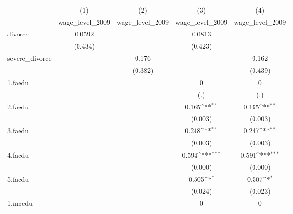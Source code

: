{
\def\sym#1{\ifmmode^{#1}\else\(^{#1}\)\fi}
\begin{tabular}{l*{4}{c}}
\hline\hline
            &\multicolumn{1}{c}{(1)}&\multicolumn{1}{c}{(2)}&\multicolumn{1}{c}{(3)}&\multicolumn{1}{c}{(4)}\\
            &\multicolumn{1}{c}{wage\_level\_2009}&\multicolumn{1}{c}{wage\_level\_2009}&\multicolumn{1}{c}{wage\_level\_2009}&\multicolumn{1}{c}{wage\_level\_2009}\\
\hline
divorce     &      0.0592         &                     &      0.0813         &                     \\
            &     (0.434)         &                     &     (0.423)         &                     \\
[1em]
severe\_divorce&                     &       0.176         &                     &       0.162         \\
            &                     &     (0.382)         &                     &     (0.439)         \\
[1em]
1.faedu     &                     &                     &           0         &           0         \\
            &                     &                     &         (.)         &         (.)         \\
[1em]
2.faedu     &                     &                     &       0.165\sym{**} &       0.165\sym{**} \\
            &                     &                     &     (0.003)         &     (0.003)         \\
[1em]
3.faedu     &                     &                     &       0.248\sym{**} &       0.247\sym{**} \\
            &                     &                     &     (0.003)         &     (0.003)         \\
[1em]
4.faedu     &                     &                     &       0.594\sym{***}&       0.591\sym{***}\\
            &                     &                     &     (0.000)         &     (0.000)         \\
[1em]
5.faedu     &                     &                     &       0.505\sym{*}  &       0.507\sym{*}  \\
            &                     &                     &     (0.024)         &     (0.023)         \\
[1em]
1.moedu     &                     &                     &           0         &           0         \\

\end{tabular}}
